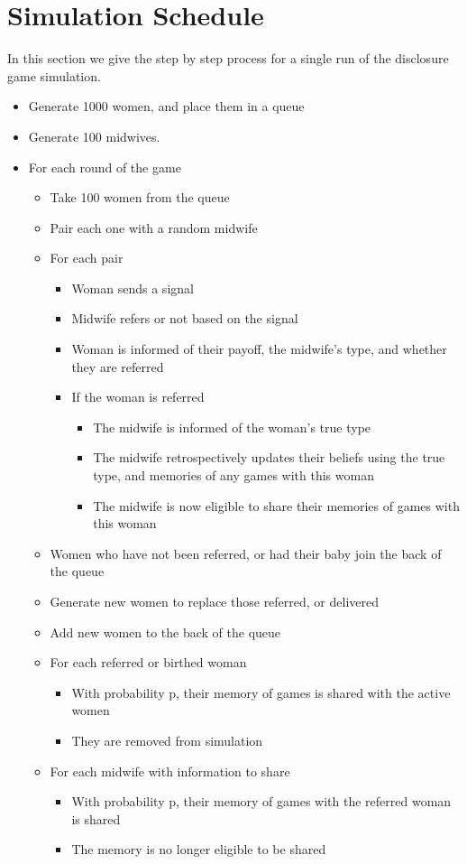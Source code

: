 
\section{Simulation Schedule}
\label{app:sim_schedule}

In this section we give the step by step process for a single run of the disclosure game simulation.

\begin{itemize}
\item Generate 1000 women, and place them in a queue
\item Generate 100 midwives.
\item For each round of the game
\begin{itemize}
	\item Take 100 women from the queue
	\item Pair each one with a random midwife
	\item For each pair
	\begin{itemize}
		\item Woman sends a signal
		\item Midwife refers or not based on the signal
		\item Woman is informed of their payoff, the midwife's type, and whether they are referred
		\item If the woman is referred
		\begin{itemize}
			\item The midwife is informed of the woman's true type
			\item The midwife retrospectively updates their beliefs using the true type, and memories of any games with this woman
			\item The midwife is now eligible to share their memories of games with this woman
		\end{itemize}
	\end{itemize}
	\item Women who have not been referred, or had their baby join the back of the queue
	\item Generate new women to replace those referred, or delivered
	\item Add new women to the back of the queue
	\item For each referred or birthed woman
	\begin{itemize}
		\item With probability p, their memory of games is shared with the active women
		\item They are removed from simulation
	\end{itemize}
	\item For each midwife with information to share
	\begin{itemize}
		\item With probability p, their memory of games with the referred woman is shared
		\item The memory is no longer eligible to be shared
	\end{itemize}
\end{itemize}
\end{itemize}